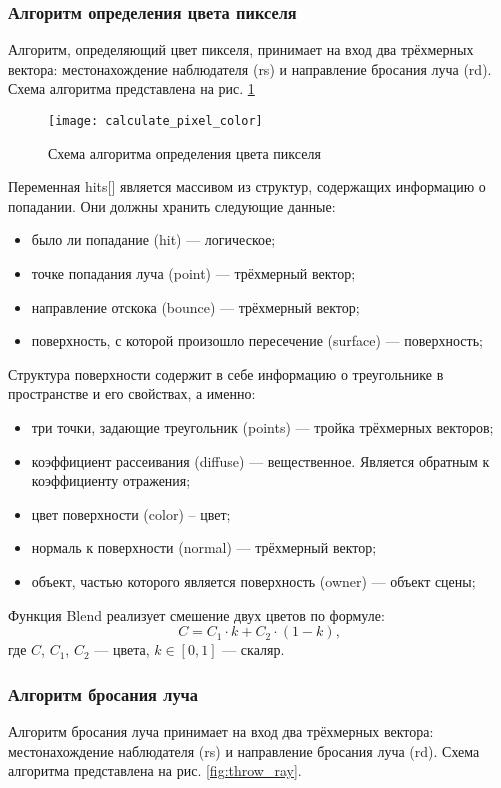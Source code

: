 \subsubsection{Алгоритм определения цвета пикселя}
Алгоритм, определяющий цвет пикселя, принимает на вход два трёхмерных вектора: местонахождение наблюдателя (rs) и направление бросания луча (rd). Схема алгоритма представлена на рис. \ref{fig:calculate_pixel_color}

\begin{figure}[!ht]
	\centering
	\texttt{[image: calculate\_pixel\_color]}
	\caption{Схема алгоритма определения цвета пикселя}
	\label{fig:calculate_pixel_color}
\end{figure}

Переменная hits[] является массивом из структур, содержащих информацию о попадании. Они должны хранить следующие данные:
\begin{itemize}
	\item было ли попадание (hit) --- логическое;
	\item точке попадания луча (point) --- трёхмерный вектор;
	\item направление отскока (bounce) --- трёхмерный вектор;
	\item поверхность, с которой произошло пересечение (surface) --- поверхность;
\end{itemize}

Структура поверхности содержит в себе информацию о треугольнике в пространстве и его свойствах, а именно:
\begin{itemize}
	\item три точки, задающие треугольник (points) --- тройка трёхмерных векторов;
	\item коэффициент рассеивания (diffuse) --- вещественное. Является обратным к коэффициенту отражения;
	\item цвет поверхности (color) – цвет;
	\item нормаль к поверхности (normal) --- трёхмерный вектор;
	\item объект, частью которого является поверхность (owner) --- объект сцены;
\end{itemize}

Функция Blend реализует смешение двух цветов по формуле:
\begin{equation}
	C = C_1\cdot k+C_2\cdot(1-k),
\end{equation}
где $C$, $C_1$, $C_2$ --- цвета, $k\in[0, 1]$ --- скаляр.

\subsubsection{Алгоритм бросания луча}
Алгоритм бросания луча принимает на вход два трёхмерных вектора: местонахождение наблюдателя (rs) и направление бросания луча (rd). Схема алгоритма представлена на рис. \ref{fig:throw_ray}.

